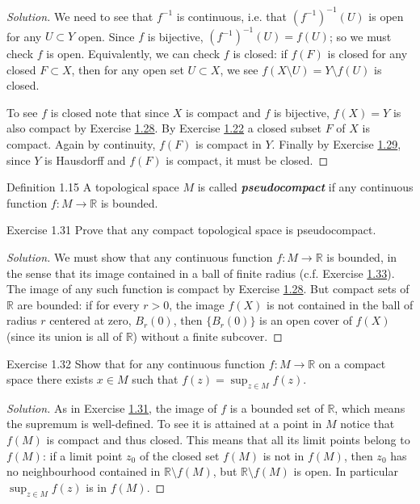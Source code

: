 \begin{proof}[Solution]\leavevmode
We need to see that $f^{-1}$ is continuous, i.e. that $(f^{-1})^{-1}(U)$ is open for any $U \subset Y$ open. Since $f$ is bijective,  $(f^{-1})^{-1}(U)=f(U)$; so we must check $f$ is open. Equivalently, we can check $f$ is closed:  if $f(F)$ is closed for any closed $F \subset X$, then for any open set $U\subset X$, we see $f(X\setminus U)=Y\setminus f(U)$ is closed.

To see $f$ is closed note that since $X$ is compact and  $f$ is bijective, $f(X)=Y$ is also compact by  Exercise \hyperref[exer:1.28]{1.28}. By Exercise \hyperref[exer:1.22]{1.22} a closed subset $F$ of $X$ is compact. Again by continuity, $f(F)$ is compact in  $Y$. Finally by Exercise \hyperref[exer:1.29]{1.29}, since $Y$ is Hausdorff and $f(F)$ is compact, it must be closed.
\end{proof}


\begin{thing3}{Definition 1.15}\leavevmode
	A topological space $M$ is called \textit{\textbf{pseudocompact}} if any continuous function $f:M\to \mathbb{R}$ is bounded.
\end{thing3}

\begin{thing4}{Exercise 1.31}\label{exer:1.31}\leavevmode
Prove that any compact topological space is pseudocompact.
\end{thing4}

\begin{proof}[Solution]\leavevmode
We must show that any continuous function $f:M \to \mathbb{R}$ is bounded, in the sense that its image contained in a ball of finite radius (c.f. Exercise \hyperref[exer:1.33]{1.33}). The image of any such function is compact by Exercise \hyperref[exer:1.28]{1.28}. But compact sets of $\mathbb{R}$ are bounded: if for every $r>0$, the image  $f(X)$ is not contained in the ball of radius $r$ centered at zero, $B_r(0)$, then $\{B_r(0)\}$ is an open cover of $f(X)$ (since its union is all of  $\mathbb{R}$) without a finite subcover.
\end{proof}

\begin{thing4}{Exercise 1.32}\label{exer:1.32}\leavevmode
Show that for any continuous function $f:M\longrightarrow \mathbb{R}$ on a compact space there exists $x \in M$ such that  $f(z)=\operatorname{sup}_{z \in  M} f(z)$.
\end{thing4}

\begin{proof}[Solution]\leavevmode
As in Exercise \hyperref[exer:1.31]{1.31}, the image of $f$ is a bounded set of $ \mathbb{R}$, which means the supremum is well-defined. To see it is attained at a point in $M$ notice that $f(M)$ is compact and thus closed. This means that all its limit points belong to  $f(M)$: if a limit point $z_0$ of the closed set $f(M)$ is not in $f(M)$, then $z_0$ has no neighbourhood contained in $\mathbb{R}\setminus f(M)$, but $\mathbb{R}\setminus f(M)$ is open. In particular  $\operatorname{sup}_{z \in M}f(z)$ is in $f(M)$.
\end{proof}

